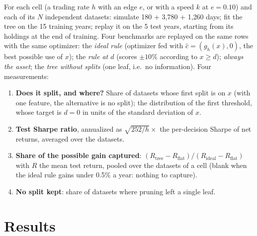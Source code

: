 \documentclass[11pt,a4paper]{article}
\newcommand{\1}{\mathbf{1}}
\begin{document}
For each cell (a trading rate $h$ with an edge $e$, or with a speed $k$ at $e=0.10$) and each of its $N$ independent datasets: simulate 180 + 3{,}780 + 1{,}260 days; fit the tree on the 15 training years; replay it on the 5 test years, starting from its holdings at the end of training. Four benchmarks are replayed on the same rows with the same optimizer: the \emph{ideal rule} (optimizer fed with $\hat c=(g_h(x),0)$, the best possible use of $x$); the \emph{rule at $d$} (scores $\pm10\%$ according to $x\ge d$); \emph{always the asset}; the \emph{tree without splits} (one leaf, i.e.\ no information). Four measurements:
\begin{enumerate}\setlength{\itemsep}{1pt}
\item \textbf{Does it split, and where?} Share of datasets whose first split is on $x$ (with one feature, the alternative is no split); the distribution of the first threshold, whose target is $d=0$ in units of the standard deviation of $x$.
\item \textbf{Test Sharpe ratio}, annualized as $\sqrt{252/h}\times$ the per-decision Sharpe of net returns, averaged over the datasets.
\item \textbf{Share of the possible gain captured}: $(R_{\text{tree}}-R_{\text{flat}})/(R_{\text{ideal}}-R_{\text{flat}})$ with $R$ the mean test return, pooled over the datasets of a cell (blank when the ideal rule gains under 0.5\% a year: nothing to capture).
\item \textbf{No split kept}: share of datasets where pruning left a single leaf.
\end{enumerate}

\section{Results}\label{sec:results}
\end{document}
